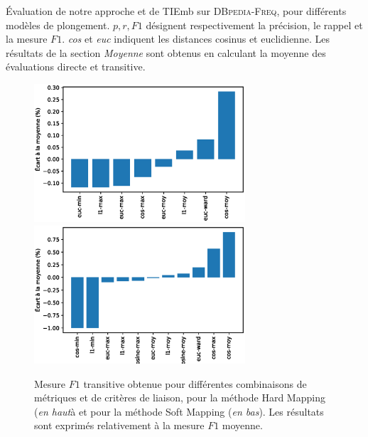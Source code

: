 
\begin{table}
    \centering
    \caption[Évaluation de trois méthodes d'extraction de taxonomie]{
    Évaluation de notre approche et de TIEmb sur \textsc{DBpedia-Freq}, pour différents modèles de plongement. $p, r, F1$ désignent respectivement la précision, le rappel et la mesure $F1$. \textit{cos} et \textit{euc} indiquent les distances cosinus et euclidienne. Les résultats de la section \textit{Moyenne} sont obtenus en calculant la moyenne des évaluations directe et transitive.}
    
    \label{tab:te-results}
\end{table}


\begin{figure}
    \centering
    \includegraphics[width=0.7\textwidth]{fig/plot/taxex_cluster-params_HM.eps}
    \includegraphics[width=0.7\textwidth]{fig/plot/taxex_cluster-params_SM.eps}
    \caption[Influence des paramètres de regroupement sur l'extraction de taxonomie]{Mesure $F1$ transitive obtenue pour différentes combinaisons de métriques et de critères de liaison, pour la méthode Hard Mapping (\textit{en haut}à et pour la méthode Soft Mapping (\textit{en bas}). Les résultats sont exprimés relativement à la mesure $F1$ moyenne.}
    \label{fig:taxex-cluparams-HM}
\end{figure}


